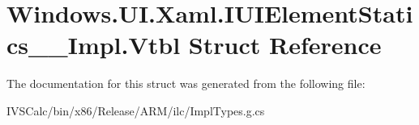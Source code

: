 \hypertarget{struct_windows_1_1_u_i_1_1_xaml_1_1_i_u_i_element_statics_____impl_1_1_vtbl}{}\section{Windows.\+U\+I.\+Xaml.\+I\+U\+I\+Element\+Statics\+\_\+\+\_\+\+Impl.\+Vtbl Struct Reference}
\label{struct_windows_1_1_u_i_1_1_xaml_1_1_i_u_i_element_statics_____impl_1_1_vtbl}


The documentation for this struct was generated from the following file\+:\begin{DoxyCompactItemize}
\item 
I\+V\+S\+Calc/bin/x86/\+Release/\+A\+R\+M/ilc/Impl\+Types.\+g.\+cs\end{DoxyCompactItemize}
